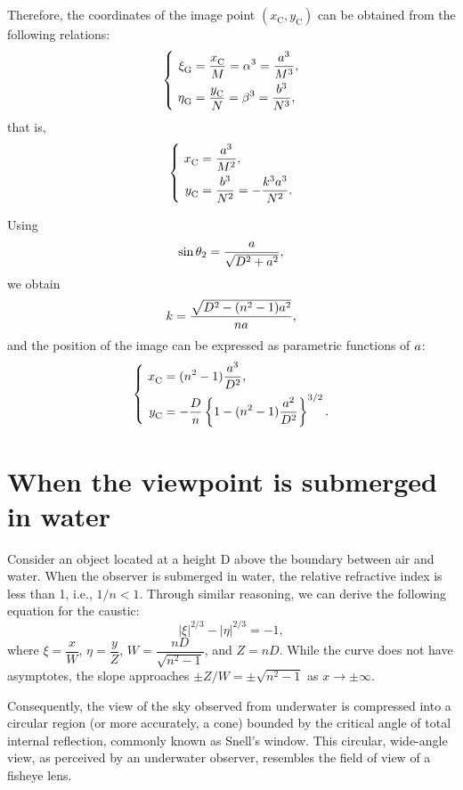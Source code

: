 \documentclass[twocolumn]{article}
\begin{document}
Therefore, the coordinates of the image point $(x_{\mathrm{C}}^{}, y_{\mathrm{C}}^{})$ can be obtained from the following relations:
$$ \left\{ 
\begin{aligned}
	\xi_{\mathrm{G}}^{} &= \dfrac{x_{\mathrm{C}}^{}}{M} = \greeka^3 = \dfrac{\romana^3}{M^3},\\
	\eta_{\mathrm{G}}^{} &= \dfrac{y_{\mathrm{C}}^{}}{N} = \greekb^3 = \dfrac{\romanb^3}{N^3},
\end{aligned}
\right.$$
that is,
$$\left\{ 
\begin{aligned}
	x_{\mathrm{C}}^{} &= \dfrac{\romana^3}{M^2},\\
	y_{\mathrm{C}}^{} &= \dfrac{\romanb^3}{N^2}=-\dfrac{k^3\romana^3}{N^2}.
\end{aligned}
\right.$$

Using 
$$\sin\theta_2 = \dfrac{{a}}{\sqrt{D^2+{a}^2}},$$
we obtain
$$k = \dfrac{\sqrt{D^2-(n^2-1){a}^2}}{n{a}},$$
and the position of the image can be expressed as parametric functions of ${a}$:
$$ \left\{ 
\begin{aligned}
	x_{\mathrm{C}}^{} &= (n^2-1)\dfrac{\romana^3}{D^2},\\
	y_{\mathrm{C}}^{} 
	&=-\dfrac{D}{n}\left\{ 1-(n^2-1)\dfrac{\romana^2}{D^2} \right\}^{3/2}.
\end{aligned}
\right.$$

\section{When the viewpoint is submerged in water}

Consider an object located at a height D above the boundary between air and water. When the observer is submerged in water, the relative refractive index is less than 1, i.e., $1/n < 1$. Through similar reasoning, we can derive the following equation for the caustic:
$$ \left| \xi \right|^{2/3} - \left| \eta \right|^{2/3} = -1, $$
where $\xi = \dfrac{x}{W} $, $\eta = \dfrac{y}{Z}$, $W = \dfrac{nD}{\sqrt{n^2-1}}$, and $Z = nD$. 
While the curve does not have asymptotes, the slope approaches $\pm Z/W = \pm \sqrt{n^2-1}$ as $x \to \pm\infty$.

Consequently, the view of the sky observed from underwater is compressed into a circular region (or more accurately, a cone) bounded by the critical angle of total internal reflection, commonly known as Snell's window. This circular, wide-angle view, as perceived by an underwater observer, resembles the field of view of a fisheye lens.
\end{document}
